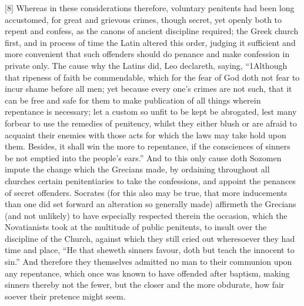 [8] Whereas in these considerations therefore, voluntary penitents had been long accustomed, for great and grievous crimes, though secret, yet openly both to repent and confess, as the canons of ancient discipline required; the Greek church first, and in process of time the Latin altered this order, judging it sufficient and more convenient that such offenders should do penance and make confession in private only. The cause why the Latins did, Leo declareth, saying,  “1Although that ripeness of faith be commendable, which for the fear of God doth not fear to incur shame before all men; yet because every one’s crimes are not such, that it can be free and safe for them to make publication of all things wherein repentance is necessary; let a custom so unfit to be kept be abrogated, lest many forbear to use the remedies of penitency, whilst they either blush or are afraid to acquaint their enemies with those acts for which the laws may take hold upon them. Besides, it shall win the more to repentance, if the consciences of sinners be not emptied into the people’s ears.” And to this only cause doth Sozomen impute the change which the Grecians made, by ordaining throughout all churches certain penitentiaries to take the confessions, and appoint the penances of secret offenders. Socrates (for this also may be true, that more inducements than one did set forward an alteration so generally made) affirmeth the Grecians (and not unlikely) to have especially respected therein the occasion, which the Novatianists took at the multitude of public penitents, to insult over the discipline of the Church, against which they still cried out wheresoever they had time and place, “He that sheweth sinners favour, doth but teach the innocent to  sin.” And therefore they themselves admitted no man to their communion upon any repentance, which once was known to have offended after baptism, making sinners thereby not the fewer, but the closer and the more obdurate, how fair soever their pretence might seem.

